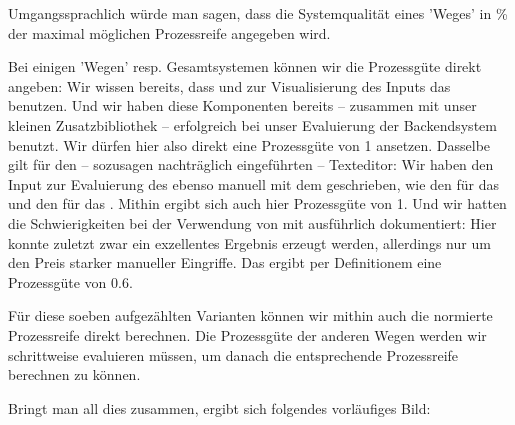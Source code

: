 Umgangssprachlich würde man sagen, dass die Systemqualität eines 'Weges' in \% der
maximal möglichen Prozessreife angegeben wird. 

Bei einigen 'Wegen' resp. Gesamtsystemen können wir die Prozessgüte direkt
angeben: Wir wissen bereits, dass  und  zur
Visualisierung des Inputs das  benutzen. Und wir haben
diese Komponenten bereits -- zusammen mit unser kleinen Zusatzbibliothek --
erfolgreich bei unser Evaluierung der Backendsystem benutzt. Wir dürfen hier
also direkt eine Prozessgüte von 1 ansetzen. Dasselbe gilt für den -- sozusagen
nachträglich eingeführten -- Texteditor: Wir haben den Input zur Evaluierung des
 ebenso manuell mit dem 
geschrieben, wie den für das  und den für das
. Mithin ergibt sich auch hier Prozessgüte von 1.
Und wir hatten die Schwierigkeiten bei der Verwendung von  mit
 ausführlich dokumentiert: Hier konnte zuletzt zwar ein
exzellentes Ergebnis erzeugt werden, allerdings nur um den Preis starker
manueller Eingriffe. Das ergibt per Definitionem eine Prozessgüte von $0.6$.

Für diese soeben aufgezählten Varianten können wir mithin auch die normierte
Prozessreife direkt berechnen. Die Prozessgüte der anderen Wegen werden wir
schrittweise evaluieren müssen, um danach die entsprechende Prozessreife
berechnen zu können.

Bringt man all dies zusammen, ergibt sich folgendes vorläufiges Bild:

